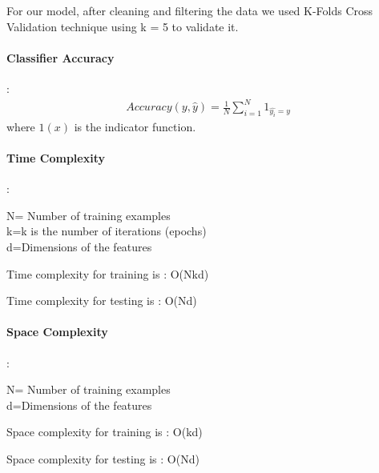 \documentclass[11pt]{article}
\begin{document}
For our model, after cleaning and filtering the data we used K-Folds Cross Validation technique using k = 5 to validate it.

\paragraph{Classifier Accuracy }: 
\begin{align*}
    Accuracy (y, {\hat{y}})= \frac{1}{N} \sum_{i=1}^{N} {1}_{{\hat{y_{i}}} = y}
\end{align*}
where ${1} (x)$  is the indicator function.


\paragraph{Time Complexity}:

N= Number of training examples\\
k=k is the number of iterations (epochs)\\ 
d=Dimensions of the features

Time complexity for training is : O(Nkd)

Time complexity for testing is : O(Nd)


\paragraph{Space Complexity}:

N= Number of training examples\\
d=Dimensions of the features

Space complexity for training is : O(kd)

Space complexity for testing is : O(Nd)
\end{document}
